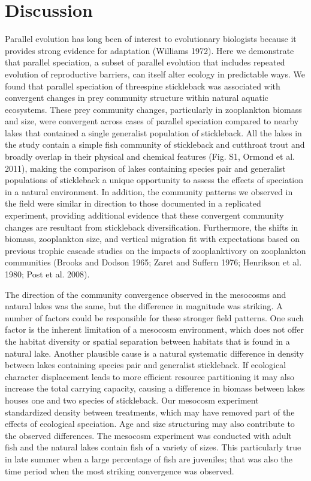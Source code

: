 \documentclass[11pt]{article}
\begin{document}
\section*{Discussion}

Parallel evolution has long been of interest to evolutionary biologists because it provides strong evidence for adaptation (Williams 1972).  Here we demonstrate that parallel speciation, a subset of parallel evolution that includes repeated evolution of reproductive barriers, can itself alter ecology in predictable ways.  We found that parallel speciation of threespine stickleback was associated with convergent changes in prey community structure within natural aquatic ecosystems.  These prey community changes, particularly in zooplankton biomass and size, were convergent across cases of parallel speciation compared to nearby lakes that contained a single generalist population of stickleback.  All the lakes in the study contain a simple fish community of stickleback and cutthroat trout and broadly overlap in their physical and chemical features (Fig. S1, Ormond et al. 2011), making the comparison of lakes containing species pair and generalist populations of stickleback a unique opportunity to assess the effects of speciation in a natural environment.  In addition, the community patterns we observed in the field were similar in direction to those documented in a replicated experiment, providing additional evidence that these convergent community changes are resultant from stickleback diversification.  Furthermore, the shifts in biomass, zooplankton size, and vertical migration fit with expectations based on previous trophic cascade studies on the impacts of zooplanktivory on zooplankton communities (Brooks and Dodson 1965; Zaret and Suffern 1976; Henrikson et al. 1980; Post et al. 2008).

The direction of the community convergence observed in the mesocosms and natural lakes was the same, but the difference in magnitude was striking.  A number of factors could be responsible for these stronger field patterns.  One such factor is the inherent limitation of a mesocosm environment, which does not offer the habitat diversity or spatial separation between habitats that is found in a natural lake.  Another plausible cause is a natural systematic difference in density between lakes containing species pair and generalist stickleback.  If ecological character displacement leads to more efficient resource partitioning it may also increase the total carrying capacity, causing a difference in biomass between lakes houses one and two species of stickleback.  Our mesocosm experiment standardized density between treatments, which may have removed part of the effects of ecological speciation.  Age and size structuring may also contribute to the observed differences.  The mesocosm experiment was conducted with adult fish and the natural lakes contain fish of a variety of sizes.  This particularly true in late summer when a large percentage of fish are juveniles; that was also the time period when the most striking convergence was observed.  
\end{document}
